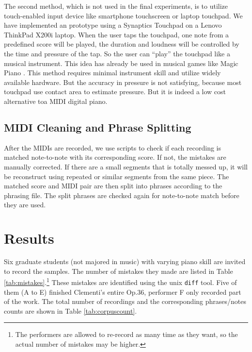 The second method, which is not used in the final experiments, is to utilize touch-enabled input device like smartphone touchscreen or laptop touchpad. We have implemented an prototype using a Synaptics Touchpad on a Lenovo ThinkPad X200i laptop. When the user taps the touchpad, one note from a predefined score will be played, the duration and loudness will be controlled by the time and pressure of the tap. So the user can \enquote{play} the touchpad like a musical instrument. This idea has already be used in musical games like Magic Piano \cite{magicpiano}. This method requires minimal instrument skill and utilize widely available hardware. But the accuracy in pressure is not satisfying, because most touchpad use contact area to estimate pressure. But it is indeed a low cost alternative toa MIDI digital piano.

\subsection{MIDI Cleaning and Phrase Splitting}
  After the MIDIs are recorded, we use scripts to check if each recording is matched note-to-note with its corresponding score. If not, the mistakes are manually corrected. %
  If there are a small segments that is totally messed up, it will be reconstruct using repeated or similar segments from the same piece. The matched score and MIDI pair are then split into phrases according to the phrasing file. The split phrases are checked again for note-to-note match before they are used.

\section{Results}
Six graduate students (not majored in music) with varying piano skill are invited to record the samples. The number of mistakes they made are listed in Table \ref{tab:mistakes}.\footnote{The performers are allowed to re-record as many time as they want, so the actual number of mistakes may be higher.} These mistakes are identified using the unix \texttt{diff}\cite{diff} tool. Five of them (A to E) finished Clementi's entire Op.36, performer F only recorded part of the work. The total number of recordings and the corresponding phrases/notes counts are shown in Table \ref{tab:corpuscount}. 

